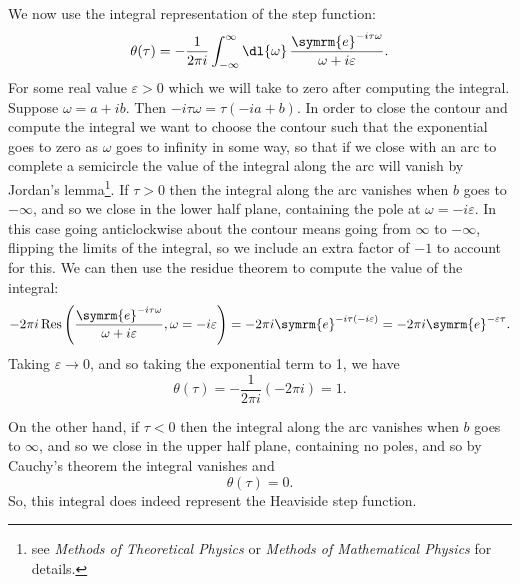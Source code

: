 \documentclass[fleqn]{NotesClass}
\newcommand*{\course}[1]{\textit{#1}}
\newcommand{\e}{\symrm{e}}
\DeclareMathOperator{\Res}{Res}
\newcommand{\heaviside}{\theta}
\begin{document}
    We now use the integral representation of the step function:
    \begin{equation}
        \heaviside(\tau) = -\frac{1}{2\pi i} \int_{-\infty}^{\infty} \dl{\omega} \, \frac{\e^{-i\tau \omega}}{\omega + i\varepsilon}.
    \end{equation}
    For some real value \(\varepsilon > 0\) which we will take to zero after computing the integral.
    Suppose \(\omega = a + ib\).
    Then \(-i\tau\omega = \tau(-ia + b)\).
    In order to close the contour and compute the integral we want to choose the contour such that the exponential goes to zero as \(\omega\) goes to infinity in some way, so that if we close with an arc to complete a semicircle the value of the integral along the arc will vanish by Jordan's lemma\footnote{see \course{Methods of Theoretical Physics} or \course{Methods of Mathematical Physics} for details.}.
    If \(\tau > 0\) then the integral along the arc vanishes when \(b\) goes to \(-\infty\), and so we close in the lower half plane, containing the pole at \(\omega = -i\varepsilon\).
    In this case going anticlockwise about the contour means going from \(\infty\) to \(-\infty\), flipping the limits of the integral, so we include an extra factor of \(-1\) to account for this.
    We can then use the residue theorem to compute the value of the integral:
    \begin{equation}
        -2\pi i \Res\left( \frac{\e^{-i\tau \omega}}{\omega + i\varepsilon}, \omega = -i\varepsilon \right) = -2\pi i\e^{-i\tau (-i\varepsilon)} = -2\pi i\e^{-\varepsilon \tau}.
    \end{equation}
    Taking \(\varepsilon \to 0\), and so taking the exponential term to 1, we have
    \begin{equation}
        \heaviside(\tau) = -\frac{1}{2\pi i} (-2\pi i) = 1.
    \end{equation}
    
    On the other hand, if \(\tau < 0\) then the integral along the arc vanishes when \(b\) goes to \(\infty\), and so we close in the upper half plane, containing no poles, and so by Cauchy's theorem the integral vanishes and
    \begin{equation}
        \heaviside(\tau) = 0.
    \end{equation}
    So, this integral does indeed represent the Heaviside step function.
    
\end{document}
